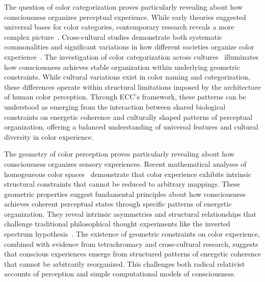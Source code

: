 The question of color categorization proves particularly revealing about how consciousness organizes perceptual experience. While early theories suggested universal bases for color categories, contemporary research reveals a more complex picture~\cite{KayRegier2003, van2025processes}. Cross-cultural studies demonstrate both systematic commonalities and significant variations in how different societies organize color experience~\cite{MacLaury1997, hunt2024electromagnetic}. The investigation of color categorization across cultures~\cite{Kay2003, pinotsis2023cytoelectric} illuminates how consciousness achieves stable organization within underlying geometric constraints. While cultural variations exist in color naming and categorization, these differences operate within structural limitations imposed by the architecture of human color perception. Through ECC's framework, these patterns can be understood as emerging from the interaction between shared biological constraints on energetic coherence and culturally shaped patterns of perceptual organization, offering a balanced understanding of universal features and cultural diversity in color experience.

The geometry of color perception proves particularly revealing about how consciousness organizes sensory experiences. Recent mathematical analyses of homogeneous color spaces~\cite{Provenzi2020, da2024mathematical} demonstrate that color experience exhibits intrinsic structural constraints that cannot be reduced to arbitrary mappings. These geometric properties suggest fundamental principles about how consciousness achieves coherent perceptual states through specific patterns of energetic organization. They reveal intrinsic asymmetries and structural relationships that challenge traditional philosophical thought experiments like the inverted spectrum hypothesis~\cite{Block1990, butlin2023consciousnessartificialintelligenceinsights}. The existence of geometric constraints on color experience, combined with evidence from tetrachromacy and cross-cultural research, suggests that conscious experiences emerge from structured patterns of energetic coherence that cannot be arbitrarily reorganized. This challenges both radical relativist accounts of perception and simple computational models of consciousness.

